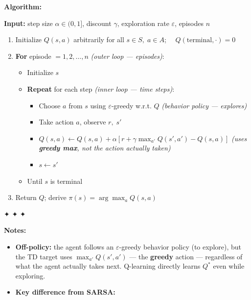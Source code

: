 \documentclass[11pt]{article}
\providecommand{\tightlist}{%
      \setlength{\itemsep}{0pt}\setlength{\parskip}{0pt}}
\begin{document}
    \textbf{Algorithm:}

\textbf{Input:} step size \(\alpha \in (0,1]\), discount \(\gamma\),
exploration rate \(\varepsilon\), episodes \(n\)

\begin{enumerate}
\def\labelenumi{\arabic{enumi}.}
\item
  Initialize \(Q(s,a)\) arbitrarily for all \(s \in S,\; a \in A\);
  \(\quad Q(\text{terminal}, \cdot) = 0\)
\item
  \textbf{For} episode \(= 1, 2, \ldots, n\) \emph{(outer loop ---
  episodes)}:

  \begin{itemize}
  \tightlist
  \item
    Initialize \(s\)
  \item
    \textbf{Repeat} for each step \emph{(inner loop --- time steps)}:

    \begin{itemize}
    \tightlist
    \item
      Choose \(a\) from \(s\) using \(\varepsilon\)-greedy w.r.t. \(Q\)
      \emph{(behavior policy --- explores)}
    \item
      Take action \(a\), observe \(r,\; s'\)
    \item
      \(Q(s,a) \leftarrow Q(s,a) + \alpha\!\left[r + \gamma \max_{a'} Q(s',a') - Q(s,a)\right]\)
      \emph{(uses \textbf{greedy max}, not the action actually taken)}
    \item
      \(s \leftarrow s'\)
    \end{itemize}
  \item
    Until \(s\) is terminal
  \end{itemize}
\item
  Return \(Q\); derive \(\pi(s) = \arg\max_a Q(s,a)\)
\end{enumerate}

✦ ✦ ✦

\textbf{Notes:}

\begin{itemize}
\tightlist
\item
  \textbf{Off-policy:} the agent follows an \(\varepsilon\)-greedy
  behavior policy (to explore), but the TD target uses
  \(\max_{a'} Q(s',a')\) --- the \textbf{greedy} action --- regardless
  of what the agent actually takes next. Q-learning directly learns
  \(Q^*\) even while exploring.
\item
  \textbf{Key difference from SARSA:}
\end{itemize}
\end{document}
